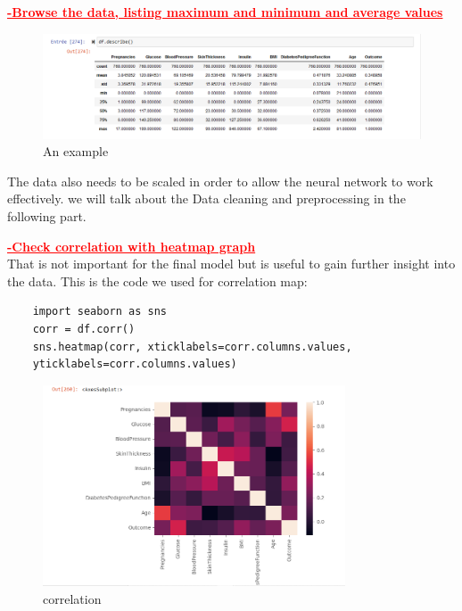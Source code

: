 \textcolor{red}{\textbf{\underline{-Browse the data, listing maximum and minimum and average values}}
}
\begin{figure}[htp]
    \centering
    \includegraphics[width=1.3\textwidth]{images/dataframe-description.png}
    \caption{An example }
    \label{fig:example2}
\end{figure}

The data also needs to be scaled in order to allow the neural network to work effectively.
we will talk about the Data cleaning and preprocessing in the following part.


\textcolor{red}{\underline{\textbf{-Check correlation with heatmap graph}}}\\

That is not important for the final model but is useful to 
gain further insight into the data.
This is the code we used for correlation map:

\begin{lstlisting}
    import seaborn as sns
    corr = df.corr()
    sns.heatmap(corr, xticklabels=corr.columns.values,
    yticklabels=corr.columns.values)
 \end{lstlisting}

    \begin{figure}[htp]
        \centering
        \includegraphics[width=0.8\textwidth]{images/correlation.png}
        \caption{correlation }
        \label{fig:example3}
    \end{figure}
    
